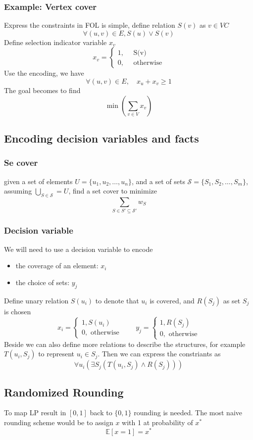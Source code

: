 \documentclass[10pt]{article}
\theoremstyle{definition}
\begin{document}
\subsubsection*{Example: Vertex cover}
Express the constraints in FOL is simple, define relation $S(v)$ as $v \in VC$
\[\forall (u, v) \in E, S(u) \lor S(v)\]
Define selection indicator variable $x_v$
\[x_v = \begin{cases}
  1, \quad \text{ S(v)}\\
  0, \quad \text{ otherwise}
\end{cases}\]
Use the encoding, we have 
\[\forall (u, v ) \in E, \quad x_u + x_v \geq 1\]
The goal becomes to find 
\[\min(\sum_{v \in V} x_v )\]
\subsection{Encoding decision variables and facts}
\subsubsection*{Se cover}
given a set of elements $U = \{u_1, u_2, \dots, u_n\}$, and a set of sets $\mathcal{S} = \{S_1, S_2, \dots, S_m\}$, assuming 
$\bigcup_{S\in \mathcal{S}} = U$, find a set cover to minimize
\[\sum_{S \in S' \subseteq \mathcal{S}'} w_S\]
\subsubsection*{Decision variable}
We will need to use a decision variable to encode 
\begin{itemize}
  \item the coverage of an element: $x_i$
  \item the choice of sets: $y_j$
\end{itemize}
Define unary relation $S(u_i)$ to denote that $u_i$ is covered, and $R(S_j)$ as set $S_j$ is chosen 
\[x_i = \begin{cases}
  1, S(u_i)\\
  0, \text{ otherwise}
\end{cases}
\qquad
y_j = \begin{cases}
    1, R(S_j)\\
    0, \text{ otherwise}
  \end{cases}\]
Beside we can also define more relations to describe the structures, for example 
$T(u_i, S_j)$ to represent $u_i \in S_j$. Then we can express the constriants as 
\[\forall u_i (\exists S_j (T(u_i, S_j) \land R(S_j)))\]
\subsection{Randomized Rounding}
To map LP result in $[0, 1]$ back to $\{0, 1\}$ rounding is needed. The most naive rounding scheme would be
to assign $x$ with 1 at probability of $x^*$
\[\mathbb{E}[x = 1] = x^*\]
\end{document}
